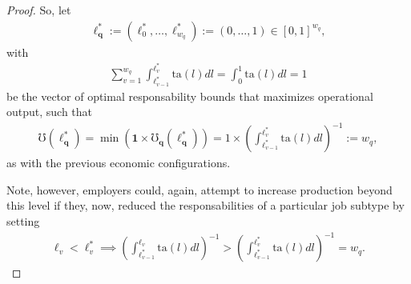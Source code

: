 \documentclass[hidelinks, nonatbib]{elsarticle}
\begin{document}
\begin{lemma}
\begin{proof}
        So, let 
        \begin{gather}
            \boldsymbol{\ell_{q}^{*}}
            :=
            (\ell_{0}^{*}, \dots, \ell_{w_q}^{*})
            :=
            (0, \dots, 1) 
            \in [0,1]^{w_q}
            ,
        \end{gather}
        with
        \begin{gather}
        \sum_{v=1}^{w_q}
        \int_{
            \ell_{v-1}^{*}
        }^{
            \ell_{v}^{*}
        }
        \text{ta}(l)dl
        =
        \int_{0}^{1}
        \text{ta}(l)dl
        =
        1
        \end{gather}
        be the vector of optimal responsability bounds that maximizes operational output, such that
        \begin{gather}
            \mho(\boldsymbol{\ell_{q}^{*}})
            =
            \min(
                \boldsymbol{1}
                \times
                \boldsymbol{\mho_q}(
                    \boldsymbol{\ell_{q}^{*}}
                )
            )
            =
            1
            \times
            \left(
                \int_{
                    \ell_{v-1}^{*}
                }^{
                    \ell_{v}^{*}
                }
                \text{ta}(l)dl
            \right) ^ {-1}
            :=
            w_q
            ,
        \end{gather}
        as with the previous economic configurations.
        
        Note, however, employers could, again, attempt to increase production beyond this level if they, now, reduced the responsabilities of a particular job subtype by setting
        \begin{align}
        \ell_v < \ell_{v}^{*}
        \implies
            \left(
                \int_{
                    \ell_{v-1}^{*}
                }^{
                    \ell_{v}
                }
                \text{ta}(l)dl
            \right) ^ {-1}
            >
            \left(
                \int_{
                    \ell_{v-1}^{*}
                }^{
                    \ell_{v}^{*}
                }
                \text{ta}(l)dl
            \right) ^ {-1}
            =
            w_q
            .
        \end{align}
        

\end{proof}
\end{lemma}
\end{document}
